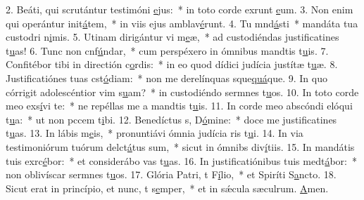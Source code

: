 2. Beáti, qui scrutántur testimóni \uline{e}jus:~* in toto corde exrunt \uline{e}um.
3. Non enim qui operántur init\uline{á}tem,~* in viis ejus amblav\uline{é}runt.
4. Tu mnd\uline{á}sti~* mandáta tua custodri n\uline{i}mis.
5. Utinam dirigántur vi m\uline{e}æ,~* ad custodiéndas justificatines t\uline{u}as!
6. Tunc non cnf\uline{ú}ndar,~* cum perspéxero in ómnibus mandtis t\uline{u}is.
7. Confitébor tibi in directión c\uline{o}rdis:~* in eo quod dídici judícia justítæ t\uline{u}æ.
8. Justificatiónes tuas cst\uline{ó}diam:~* non me derelínquas sque\uline{quá}que.
9. In quo córrigit adolescéntior vim s\uline{u}am?~* in custodiéndo sermnes t\uline{u}os.
10. In toto corde meo exs\uline{í}vi te:~* ne repéllas me a mandtis t\uline{u}is.
11. In corde meo abscóndi elóqui t\uline{u}a:~* ut non pccem t\uline{i}bi.
12. Benedíctus s, D\uline{ó}mine:~* doce me justificatines t\uline{u}as.
13. In lábis m\uline{e}is,~* pronuntiávi ómnia judícia ris t\uline{u}i.
14. In via testimoniórum tuórum delct\uline{á}tus sum,~* sicut in ómnibs div\uline{í}tiis.
15. In mandátis tuis exrc\uline{é}bor:~* et considerábo vas t\uline{u}as.
16. In justificatiónibus tuis medt\uline{á}bor:~* non oblivíscar sermnes t\uline{u}os.
17. Glória Patri, t F\uline{í}lio,~* et Spiríti S\uline{a}ncto.
18. Sicut erat in princípio, et nunc, t s\uline{e}mper,~* et in sǽcula sæculrum. \uline{A}men.
